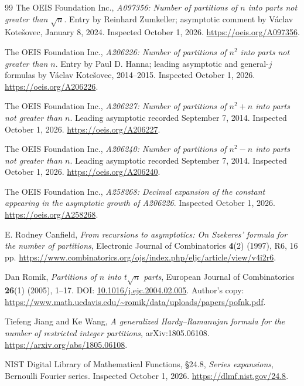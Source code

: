 \documentclass[11pt,a4paper]{article}
\numberwithin{equation}{section}
\theoremstyle{definition}
\theoremstyle{remark}
\begin{document}
\begingroup
\small
\begin{thebibliography}{99}
\setlength{\itemsep}{2pt}
The OEIS Foundation Inc., \emph{A097356: Number of partitions of $n$ into
parts not greater than $\sqrt n$}. Entry by Reinhard Zumkeller; asymptotic
comment by V\'aclav Kote\v{s}ovec, January 8, 2024. Inspected October 1,
2026. \url{https://oeis.org/A097356}.

The OEIS Foundation Inc., \emph{A206226: Number of partitions of $n^2$
into parts not greater than $n$}. Entry by Paul D. Hanna; leading
asymptotic and general-$j$ formulas by V\'aclav Kote\v{s}ovec,
2014--2015. Inspected October 1, 2026.
\url{https://oeis.org/A206226}.

The OEIS Foundation Inc., \emph{A206227: Number of partitions of $n^2+n$
into parts not greater than $n$}. Leading asymptotic recorded September
7, 2014. Inspected October 1, 2026.
\url{https://oeis.org/A206227}.

The OEIS Foundation Inc., \emph{A206240: Number of partitions of $n^2-n$
into parts not greater than $n$}. Leading asymptotic recorded September
7, 2014. Inspected October 1, 2026.
\url{https://oeis.org/A206240}.

The OEIS Foundation Inc., \emph{A258268: Decimal expansion of the constant
appearing in the asymptotic growth of A206226}. Inspected October 1,
2026. \url{https://oeis.org/A258268}.

E. Rodney Canfield, \emph{From recursions to asymptotics: On Szekeres'
formula for the number of partitions}, Electronic Journal of
Combinatorics \textbf{4}(2) (1997), R6, 16 pp.
\url{https://www.combinatorics.org/ojs/index.php/eljc/article/view/v4i2r6}.

Dan Romik, \emph{Partitions of $n$ into $t\sqrt n$ parts}, European
Journal of Combinatorics \textbf{26}(1) (2005), 1--17.
DOI: \href{https://doi.org/10.1016/j.ejc.2004.02.005}{10.1016/j.ejc.2004.02.005}.
Author's copy: \url{https://www.math.ucdavis.edu/~romik/data/uploads/papers/pofnk.pdf}.

Tiefeng Jiang and Ke Wang, \emph{A generalized Hardy--Ramanujan formula
for the number of restricted integer partitions}, arXiv:1805.06108.
\url{https://arxiv.org/abs/1805.06108}.

NIST Digital Library of Mathematical Functions, \S24.8, \emph{Series
expansions}, Bernoulli Fourier series. Inspected October 1, 2026.
\url{https://dlmf.nist.gov/24.8}.


\end{thebibliography}
\end{document}
